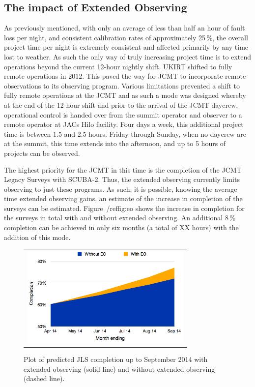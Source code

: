 \documentclass[]{spie}  %
\begin{document}
\subsection{The impact of Extended Observing}\label{sec:eo}

As previously mentioned, with only an average of less than half an
hour of fault loss per night, and consistent calibration rates of
approximately 25\,\%, the overall project time per night is extremely
consistent and affected primarily by any time lost to weather. As such
the only way of truly increasing project time is to extend operations
beyond the current 12-hour nightly shift. UKIRT shifted to fully
remote operations in 2012.\cite{2012SPIE.8448E..1GK} This paved the way for JCMT to
incorporate remote observations to its observing program.\cite{2014SPIE9149-93} Various
limitations prevented a shift to fully remote operations at the JCMT
and as such a mode was designed whereby at the end of the 12-hour
shift and prior to the arrival of the JCMT daycrew, operational
control is handed over from the summit operator and observer to a
remote operator at JACs Hilo facility. Four days a week, this
additional project time is between 1.5 and 2.5 hours. Friday
through Sunday, when no daycrew are at the summit, this time extends
into the afternoon, and up to 5 hours of projects can be observed.

The highest priority for the JCMT in this time is the completion of
the JCMT Legacy Surveys with SCUBA-2. Thus, the extended observing
currently limits observing to just these programs. As such, it is
possible, knowing the average time extended observing gains, an
estimate of the increase in completion of the surveys can be
estimated. Figure~/ref{fig:eo} shows the increase in completion for
the surveys in total with and without extended observing. An
additional 8\,\% completion can be achieved in only six months (a
total of XX hours) with the addition of this mode.

\begin{figure}[ht]
   \begin{center}
   \begin{tabular}{c}
   \includegraphics[height=5cm]{JLSspie2}
   \end{tabular}
   \end{center}
   \caption{\label{fig:eo} Plot of predicted JLS completion up to September 2014 with extended observing (solid line) and without extended observing (dashed line).}
\end{figure}
\end{document}

